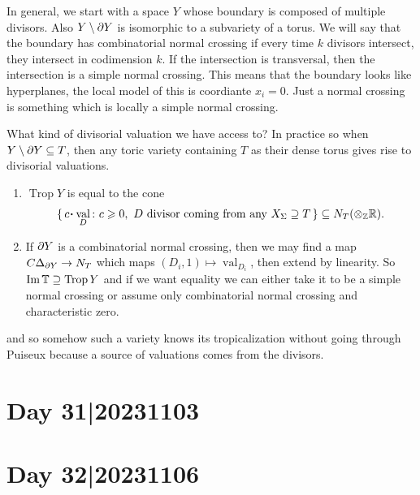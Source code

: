 \documentclass[12pt]{memoir}
\DeclareMathOperator{\val}{val}
\DeclareMathOperator{\Trop}{Trop}
\begin{document}
In general, we start with a space $Y$ whose boundary is composed of multiple divisors. Also $Y\setminus\partial Y$ is isomorphic to a subvariety of a torus. We will say that the boundary has combinatorial normal crossing if every time $k$ divisors intersect, they intersect in codimension $k$. If the intersection is transversal, then the intersection is a simple normal crossing. This means that the boundary looks like hyperplanes, the local model of this is coordiante $x_i=0$. Just a normal crossing is something which is locally a simple normal crossing.\par
What kind of divisorial valuation we have access to? In practice  so when $Y\setminus\partial Y\subseteq T$, then any toric variety containing $T$ as their dense torus gives rise to divisorial valuations.
\begin{enumerate}
    \item $\Trop Y$ is equal to the cone 
    $$\set{c\.\val_D\:\ c\geq 0,\ D\ \text{divisor coming from any }X_\Sg\supseteq T}\subseteq N_T(\ox_\bZ\bR).$$
    \item If $\partial Y$ is a combinatorial normal crossing, then we may find a map $C\Delta_{\partial Y}\to N_T$ which maps $(D_i,1)\mapsto \val_{D_i}$, then extend by linearity. So $\Im\bT\supseteq\Trop Y$ and if we want equality we can either take it to be a simple normal crossing or assume only combinatorial normal crossing and characteristic zero.
\end{enumerate}
and so somehow such a variety knows its tropicalization without going through Puiseux because a source of valuations comes from the divisors. 

\section{Day 31|20231103}
\section{Day 32|20231106}
\end{document}
